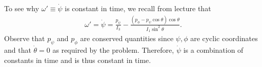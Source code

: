 \documentclass{article}
\theoremstyle{definition}
\newcommand{\f}[2]{\frac{#1}{#2}}
\begin{document}
\begin{enumerate}[label=(\alph*)]
	To see why $\omega' \equiv \dot\psi$ is constant in time, we recall from lecture that
	\begin{align*}
	\omega' = \dot\psi = \f{p_\psi}{I_3} - \f{(p_\phi - p_\psi\cos\theta)\cos\theta}{I_1\sin^2\theta}.
	\end{align*}
	Observe that $p_\psi$ and $p_\phi$ are conserved quantities since $\psi, \phi$ are cyclic coordinates and that $\dot\theta= 0$ as required by the problem. Therefore, $\dot\psi$ is a combination of constants in time and is thus constant in time. 
	

\end{enumerate}
\end{document}
